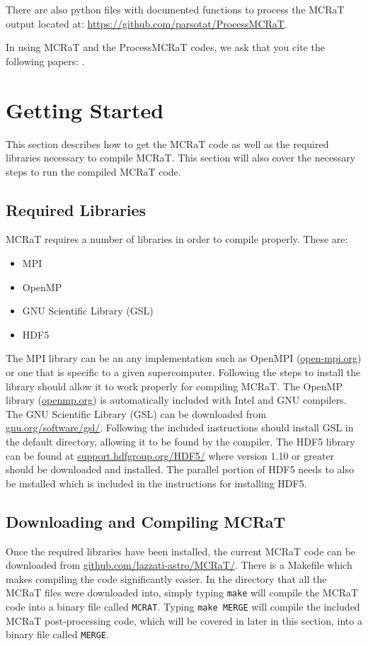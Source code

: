 \documentclass[12pt,a4paper]{article}
\begin{document}
There are also python files with documented functions to process the MCRaT output located at: \url{https://github.com/parsotat/ProcessMCRaT}.

In using MCRaT and the ProcessMCRaT codes, we ask that you cite the following papers: \cite{MCRaT, parsotan_mcrat, parsotan_var, parsotan_polarization}.

\section{Getting Started}
This section describes how to get the MCRaT code as well as the required libraries necessary to compile MCRaT. This section will also cover the necessary steps to run the compiled MCRaT code. 

\subsection{Required Libraries}
MCRaT requires a number of libraries in order to compile properly. These are:
\begin{itemize}
\item MPI
\item OpenMP
\item GNU Scientific Library (GSL)
\item HDF5
\end{itemize}

The MPI library can be an any implementation such as OpenMPI (\href{http://www.open-mpi.org/}{open-mpi.org}) or one that is specific to a given supercomputer. Following the steps to install the library should allow it to work properly for compiling MCRaT. The OpenMP library (\href{http://www.openmp.org/}{openmp.org}) is automatically included with Intel and GNU compilers. The GNU Scientific Library (GSL) can be downloaded from \href{https://www.gnu.org/software/gsl/}{gnu.org/software/gsl/}. Following the included instructions should install GSL in the default directory, allowing it to be found by the compiler. The HDF5 library can be found at \href{https://support.hdfgroup.org/HDF5/}{support.hdfgroup.org/HDF5/} where version 1.10 or greater should be downloaded and installed. The parallel portion of HDF5 needs to also be installed which is included in the instructions for installing HDF5.

\subsection{Downloading and Compiling MCRaT}
Once the required libraries have been installed, the current MCRaT code can be downloaded from \href{https://github.com/lazzati-astro/MCRaT/tree/master/HYBRID_PARALLEL_KN}{github.com/lazzati-astro/MCRaT/}. There is a Makefile which  makes compiling the code significantly easier. In the directory that all the MCRaT files were downloaded into, simply typing \texttt{make} will compile the MCRaT code into a binary file called \texttt{MCRAT}. Typing \texttt{make MERGE} will compile the included MCRaT post-processing code, which will be covered in later in this section, into a binary file called \texttt{MERGE}.
\end{document}
